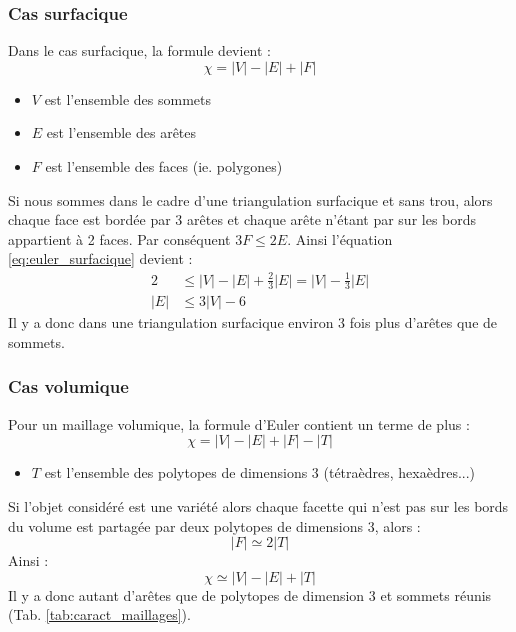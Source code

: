 \subsubsection{Cas surfacique}
\label{combi_2d}
\noindent
Dans le cas surfacique, la formule devient :
\begin{equation}
\label{eq:euler_surfacique}
\chi = |V|-|E|+|F|
\end{equation}
\begin{itemize}
\item $V$ est l'ensemble des sommets
\item $E$ est l'ensemble des arêtes
\item $F$ est l'ensemble des faces (ie. polygones)\\
\end{itemize}
Si nous sommes dans le cadre d'une triangulation surfacique et sans trou, alors chaque face est bordée par 3 arêtes et chaque arête n'étant par sur les bords appartient à 2 faces. Par conséquent $3F\leqslant 2E$. Ainsi l'équation \ref{eq:euler_surfacique} devient :\\
\begin{align*}
2 &\leqslant |V| - |E| + \frac{2}{3}|E| = |V| - \frac{1}{3}|E|\\
|E|&\leqslant 3|V|-6
\end{align*}
Il y a donc dans une triangulation surfacique environ 3 fois plus d'arêtes que de sommets.
\subsubsection{Cas volumique}
\noindent
Pour un maillage volumique, la formule d'Euler contient un terme de plus :\\
\begin{equation}
\chi = |V|-|E|+|F|-|T|
\end{equation}
\begin{itemize}
\item $T$ est l'ensemble des polytopes de dimensions 3 (tétraèdres, hexaèdres...)\\
\end{itemize}
Si l'objet considéré est une variété alors chaque facette qui n'est pas sur les bords du volume est partagée par deux polytopes de dimensions 3, alors :\\
\begin{equation}
|F|\simeq 2|T|
\end{equation}
Ainsi :
\begin{equation}
\chi \simeq |V|-|E|+|T|
\end{equation}
Il y a donc autant d'arêtes que de polytopes de dimension 3 et sommets réunis (Tab. \ref{tab:caract_maillages}).

